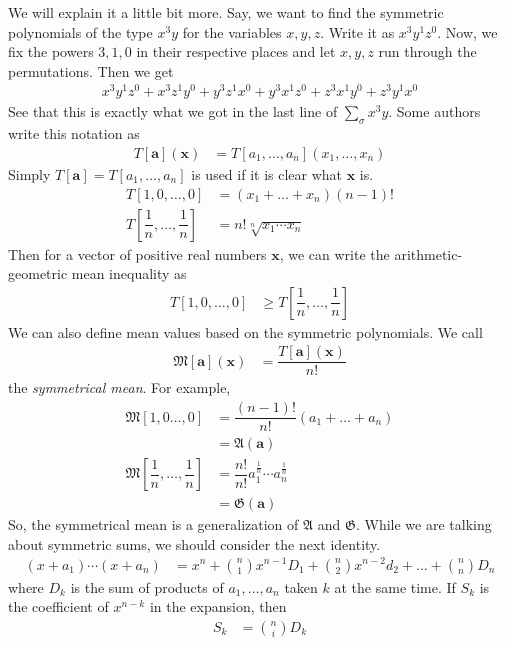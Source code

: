 \documentclass{subfile}
\begin{document}
	We will explain it a little bit more. Say, we want to find the symmetric polynomials of the type $x^{3}y$ for the variables $x,y,z$. Write it as $x^{3}y^{1}z^{0}$. Now, we fix the powers $3,1,0$ in their respective places and let $x,y,z$ run through the permutations. Then we get
		\begin{align*}
			x^{3}y^{1}z^{0}+x^{3}z^{1}y^{0}+y^{3}z^{1}x^{0}+y^{3}x^{1}z^{0}+z^{3}x^{1}y^{0}+z^{3}y^{1}x^{0}
		\end{align*}
	See that this is exactly what we got in the last line of $\sum_{\sigma}x^{3}y$. Some authors write this notation as
		\begin{align*}
			T[\mathbf{a}](\mathbf{x})
				& = T[a_{1},\ldots,a_{n}](x_{1},\ldots,x_{n})
		\end{align*}
	Simply $T[\mathbf{a}]=T[a_{1},\ldots,a_{n}]$ is used if it is clear what $\mathbf{x}$ is.
		\begin{align*}
			T[1,0,\ldots,0]
				& = (x_{1}+\ldots+x_{n})(n-1)!\\
			T\left[\dfrac{1}{n},\ldots,\dfrac{1}{n}\right]
				& = n!\sqrt[n]{x_{1}\cdots x_{n}}
		\end{align*}
	Then for a vector of positive real numbers $\mathbf{x}$, we can write the arithmetic-geometric mean inequality as
		\begin{align*}
			T[1,0,\ldots,0]
				& \geq T\left[\dfrac{1}{n},\ldots,\dfrac{1}{n}\right]
		\end{align*}
	We can also define mean values based on the symmetric polynomials. We call
		\begin{align*}
			\mathfrak{M}[\mathbf{a}](\mathbf{x})
				& = \dfrac{T[\mathbf{a}](\mathbf{x})}{n!}
		\end{align*}
	the \textit{symmetrical mean}. For example,
		\begin{align*}
			\mathfrak{M}[1,0\ldots,0]
				& = \dfrac{(n-1)!}{n!}(a_{1}+\ldots+a_{n})\\
				& = \mathfrak{A}(\mathbf{a})\\
			\mathfrak{M}\left[\dfrac{1}{n},\ldots,\dfrac{1}{n}\right]
				& = \dfrac{n!}{n!}a_{1}^{\frac{1}{n}}\cdots a_{n}^{\frac{1}{n}}\\
				& = \mathfrak{G}(\mathbf{a})
		\end{align*}
	So, the symmetrical mean is a generalization of $\mathfrak{A}$ and $\mathfrak{G}$. While we are talking about symmetric sums, we should consider the next identity.
		\begin{align*}
			(x+a_{1})\cdots(x+a_{n})
				& = x^{n}+\binom{n}{1}x^{n-1}D_{1}+\binom{n}{2}x^{n-2}d_{2}+\ldots+\binom{n}{n}D_{n}
		\end{align*}
	where $D_{k}$ is the sum of products of $a_{1},\ldots,a_{n}$ taken $k$ at the same time. If $S_{k}$ is the coefficient of $x^{n-k}$ in the expansion, then
		\begin{align*}
			S_{k}
				& = \binom{n}{i}D_{k}
		\end{align*}
	
\end{document}
